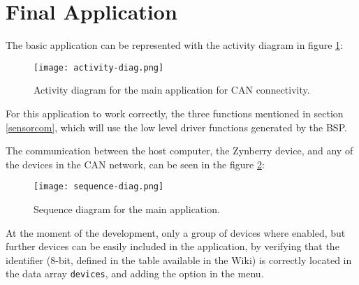 

\section{Final Application}

The basic application can be represented with the activity diagram in figure \ref{fig:activity}:

\begin{figure}[h!]
	\centering
	\texttt{[image: activity-diag.png]}
	\caption{Activity diagram for the main application for CAN connectivity.}
	\label{fig:activity}
\end{figure}

For this application to work correctly, the three functions mentioned in section \ref{sensorcom}, which will use the low level driver functions generated by the BSP.

The communication between the host computer, the Zynberry device, and any of the devices in the CAN network, can be seen in the figure \ref{fig:sequence}:

\begin{figure}[h!]
	\centering
	\texttt{[image: sequence-diag.png]}
	\caption{Sequence diagram for the main application.}
	\label{fig:sequence}
\end{figure}

At the moment of the development, only a group of devices where enabled, but further devices can be easily included in the application, by verifying that the identifier (8-bit, defined in the table available in the Wiki) is correctly located in the data array \texttt{devices}, and adding the option in the menu.


